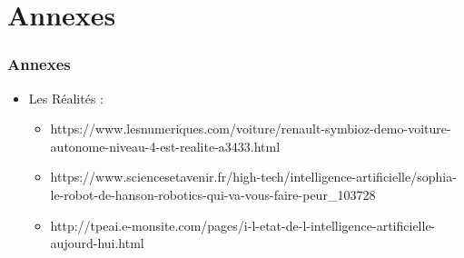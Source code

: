 \documentclass{beamer}
\begin{document}
	
	\section{Annexes}
	\begin{frame}
	\frametitle{Annexes}
	\begin{itemize}
	\itemsep1em
		\item Les Réalités :
		\begin{itemize}
		\itemsep1em
			\item https://www.lesnumeriques.com/voiture/renault-symbioz-demo-voiture-autonome-niveau-4-est-realite-a3433.html
			\item https://www.sciencesetavenir.fr/high-tech/intelligence-artificielle/sophia-le-robot-de-hanson-robotics-qui-va-vous-faire-peur\_103728
			\item http://tpeai.e-monsite.com/pages/i-l-etat-de-l-intelligence-artificielle-aujourd-hui.html
		\end{itemize}
		\end{itemize}
	\end{frame}	
		
\end{document}
